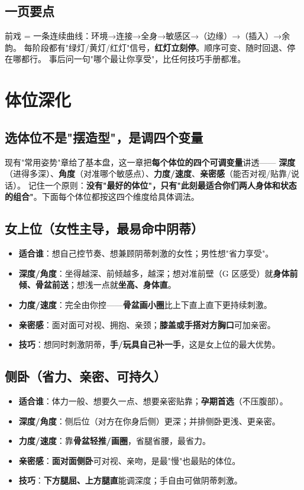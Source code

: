 \section{一页要点}
前戏 = 一条连续曲线：环境→连接→全身→敏感区→（边缘）→（插入）→余韵。
每阶段都有"绿灯/黄灯/红灯"信号，\textbf{红灯立刻停}。顺序可变、随时回退、停在哪都行。
事后问一句"哪个最让你享受"，比任何技巧手册都准。


\chapter{体位深化}

\section{选体位不是"摆造型"，是调四个变量}
现有"常用姿势"章给了基本盘，这一章把\textbf{每个体位的四个可调变量}讲透——
\textbf{深度}（进得多深）、\textbf{角度}（对准哪个敏感点）、\textbf{力度/速度}、\textbf{亲密感}（能否对视/贴靠/说话）。
记住一个原则：\textbf{没有"最好的体位"，只有"此刻最适合你们两人身体和状态的组合"}。下面每个体位都按这四个维度给具体调法。

\section{女上位（女性主导，最易命中阴蒂）}
\begin{itemize}[leftmargin=2em,itemsep=0.3em]
  \item \textbf{适合谁}：想自己控节奏、想兼顾阴蒂刺激的女性；男性想"省力享受"。
  \item \textbf{深度/角度}：坐得越深、前倾越多，越深；想对准前壁（G 区感受）就\textbf{身体前倾、骨盆前送}；想浅一点就\textbf{坐高、身体直}。
  \item \textbf{力度/速度}：完全由你控——\textbf{骨盆画小圈}比上下直上直下更持续刺激。
  \item \textbf{亲密感}：面对面可对视、拥抱、亲颈；\textbf{膝盖或手搭对方胸口}可加亲密。
  \item \textbf{技巧}：想同时刺激阴蒂，\textbf{手/玩具自己补一手}，这是女上位的最大优势。
\end{itemize}

\section{侧卧（省力、亲密、可持久）}
\begin{itemize}[leftmargin=2em,itemsep=0.3em]
  \item \textbf{适合谁}：体力一般、想要久一点、想要亲密贴靠；\textbf{孕期首选}（不压腹部）。
  \item \textbf{深度/角度}：侧后位（对方在你身后侧）更深；并排侧卧更浅、更亲密。
  \item \textbf{力度/速度}：靠\textbf{骨盆轻推/画圈}，省腿省腰，最省力。
  \item \textbf{亲密感}：\textbf{面对面侧卧}可对视、亲吻，是最"慢"也最贴的体位。
  \item \textbf{技巧}：\textbf{下方腿屈、上方腿直}能调深度；手自由可做阴蒂刺激。
\end{itemize}

